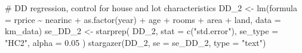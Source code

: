\documentclass[
  letterpaper,
  DIV=11,
  numbers=noendperiod]{scrartcl}
\newenvironment{Shaded}{\begin{snugshade}}{\end{snugshade}}
\newcommand{\AttributeTok}[1]{\textcolor[rgb]{0.40,0.45,0.13}{#1}}
\newcommand{\CommentTok}[1]{\textcolor[rgb]{0.37,0.37,0.37}{#1}}
\newcommand{\FloatTok}[1]{\textcolor[rgb]{0.68,0.00,0.00}{#1}}
\newcommand{\FunctionTok}[1]{\textcolor[rgb]{0.28,0.35,0.67}{#1}}
\newcommand{\NormalTok}[1]{\textcolor[rgb]{0.00,0.23,0.31}{#1}}
\newcommand{\OtherTok}[1]{\textcolor[rgb]{0.00,0.23,0.31}{#1}}
\newcommand{\SpecialCharTok}[1]{\textcolor[rgb]{0.37,0.37,0.37}{#1}}
\newcommand{\StringTok}[1]{\textcolor[rgb]{0.13,0.47,0.30}{#1}}
\begin{document}
\begin{Shaded}
\begin{Highlighting}[]
\CommentTok{\# DD regression, control for house and lot characteristics}
\NormalTok{DD\_2 }\OtherTok{\textless{}{-}} \FunctionTok{lm}\NormalTok{(}\AttributeTok{formula =}\NormalTok{ rprice }\SpecialCharTok{\textasciitilde{}}\NormalTok{ nearinc}
           \SpecialCharTok{+} \FunctionTok{as.factor}\NormalTok{(year)}
           \SpecialCharTok{+}\NormalTok{ age}
           \SpecialCharTok{+}\NormalTok{ rooms}
           \SpecialCharTok{+}\NormalTok{ area}
           \SpecialCharTok{+}\NormalTok{ land,}
           \AttributeTok{data =}\NormalTok{ km\_data)}
\NormalTok{se\_DD\_2 }\OtherTok{\textless{}{-}} \FunctionTok{starprep}\NormalTok{(}
\NormalTok{  DD\_2,}
  \AttributeTok{stat =} \FunctionTok{c}\NormalTok{(}\StringTok{"std.error"}\NormalTok{),}
  \AttributeTok{se\_type =} \StringTok{"HC2"}\NormalTok{,}
  \AttributeTok{alpha =} \FloatTok{0.05}
\NormalTok{)}
\FunctionTok{stargazer}\NormalTok{(DD\_2,}
          \AttributeTok{se =}\NormalTok{ se\_DD\_2,}
          \AttributeTok{type =} \StringTok{"text"}\NormalTok{)}
\end{Highlighting}
\end{Shaded}
\end{document}

